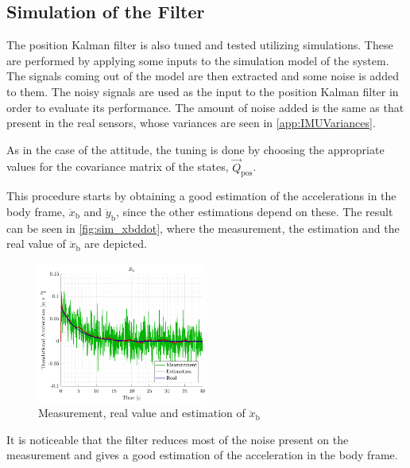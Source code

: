 \subsection{Simulation of the Filter}
The position Kalman filter is also tuned and tested utilizing simulations. These are performed by applying some inputs to the simulation model of the system. The signals coming out of the model are then extracted and some noise is added to them. The noisy signals are used as the input to the position Kalman filter in order to evaluate its performance. The amount of noise added is the same as that present in the real sensors, whose variances are seen in \autoref{app:IMUVariances}.

As in the case of the attitude, the tuning is done by choosing the appropriate values for the covariance matrix of the states, $\vec{Q}_\mathrm{pos}$. 

This procedure starts by obtaining a good estimation of the accelerations in the body frame, $\ddot{x}_\mathrm{b}$ and $\ddot{y}_\mathrm{b}$, since the other estimations depend on these. The result can be seen in \autoref{fig:sim_xbddot}, where the measurement, the estimation and the real value of $\ddot{x}_\mathrm{b}$ are depicted.
\begin{figure}[H]
    \includegraphics[width=0.5\textwidth]{figures/sim_xbddot}
    \caption{ Measurement, real value and estimation of $\ddot{x}_\mathrm{b}$}
    \label{fig:sim_xbddot}
\end{figure}
It is noticeable that the filter reduces most of the noise present on the measurement and gives a good estimation of the acceleration in the body frame.
 
